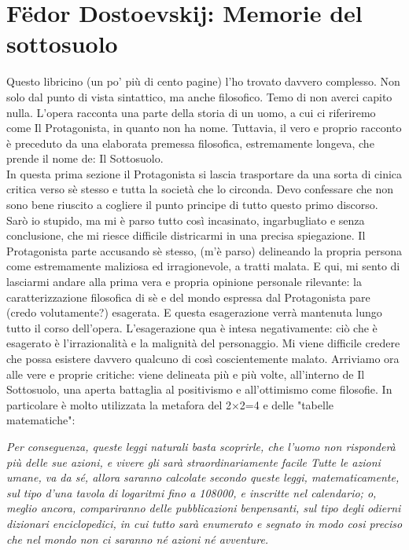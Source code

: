 \documentclass[12pt,a4paper]{report}
\theoremstyle{definition}
\theoremstyle{Theorem}
\theoremstyle{definition}
\theoremstyle{definition}
\theoremstyle{definition}
\begin{document}
\chapter{Fëdor Dostoevskij: Memorie del sottosuolo}
Questo libricino (un po' più di cento pagine) l'ho trovato davvero complesso. Non solo dal punto di vista sintattico, ma anche filosofico. Temo di non averci capito nulla. L'opera racconta una parte della storia di un uomo, a cui ci riferiremo come Il Protagonista, in quanto non ha nome. Tuttavia, il vero e proprio racconto è preceduto da una elaborata premessa filosofica, estremamente longeva, che prende il nome de: Il Sottosuolo.\\
In questa prima sezione il Protagonista si lascia trasportare da una sorta di cinica critica verso sè stesso e tutta la società che lo circonda. Devo confessare che non sono bene riuscito a cogliere il punto principe di tutto questo primo discorso. Sarò io stupido, ma mi è parso tutto così incasinato, ingarbugliato e senza conclusione, che mi riesce difficile districarmi in una precisa spiegazione. Il Protagonista parte accusando sè stesso, (m'è parso) delineando la propria persona come estremamente maliziosa ed irragionevole, a tratti malata. E qui, mi sento di lasciarmi andare alla prima vera e propria opinione personale rilevante: la caratterizzazione filosofica di sè e del mondo espressa dal Protagonista pare (credo volutamente?) esagerata. E questa esagerazione verrà mantenuta lungo tutto il corso dell'opera. L'esagerazione qua è intesa negativamente: ciò che è esagerato è l'irrazionalità e la malignità del personaggio. Mi viene difficile credere che possa esistere davvero qualcuno di così coscientemente  malato. Arriviamo ora alle vere e proprie critiche: viene delineata più e più volte, all'interno de Il Sottosuolo, una aperta battaglia al positivismo e all'ottimismo come filosofie. In particolare è molto utilizzata la metafora del 2$\times$2=4 e delle "tabelle matematiche":
\begin{center}
	\textit{Per conseguenza, queste leggi naturali basta scoprirle, che l'uomo non risponderà più delle sue azioni, e vivere gli sarà straordinariamente facile Tutte le azioni umane, va da sé, allora saranno calcolate secondo queste leggi, matematicamente, sul tipo d'una tavola di logaritmi fino a 108000, e inscritte nel calendario; o, meglio ancora, compariranno delle pubblicazioni benpensanti, sul tipo degli odierni dizionari enciclopedici, in cui tutto sarà enumerato e segnato in modo cosi preciso che nel mondo non ci saranno  né azioni né avventure.}
\end{center}
\end{document}
